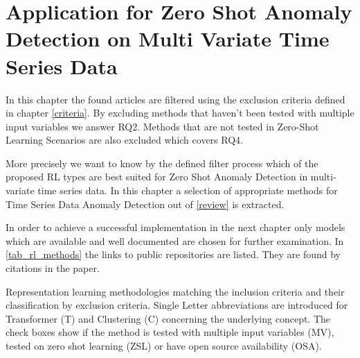 \section{Application for Zero Shot Anomaly Detection on Multi Variate Time Series Data}\label{application}
In this chapter the found articles are filtered using the exclusion criteria defined in chapter \ref{criteria}. By excluding methods that haven't been tested with multiple input variables we answer RQ2. Methods that are not tested in Zero-Shot Learning Scenarios are also excluded which covers RQ4.

More precisely we want to know by the defined filter process which of the proposed RL types are best suited for Zero Shot Anomaly Detection in multi-variate time series data. In this chapter a selection of appropriate methods for Time Series Data Anomaly Detection out of \ref{review} is extracted.

 In order to achieve a successful implementation in the next chapter only models which are available and well documented are chosen for further examination. In \ref{tab_rl_methods} the links to public repositories are listed. They are found by citations in the paper.
 \begin{table}
   \caption{Representation learning methodologies matching the inclusion criteria and their classification by exclusion criteria. Single Letter abbreviations are introduced for Transformer (T) and Clustering (C) concerning the underlying concept. The check boxes show if the method is tested with multiple input variables (MV), tested on zero shot learning (ZSL) or have open source availability (OSA).}\label{tab_rl_methods}
   
 \end{table}
